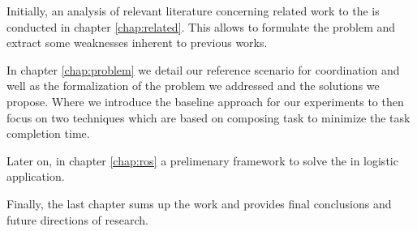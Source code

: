 Initially, an analysis of relevant literature concerning related work to the \mrs 
is conducted in chapter \ref{chap:related}. This allows to formulate the problem 
and extract some weaknesses inherent to previous works.

In chapter \ref{chap:problem} we detail our reference scenario for \mrs coordination and 
well as the formalization of the problem we addressed and the solutions we propose.
Where we introduce the baseline approach for our experiments to then focus on two techniques
which are based on composing task to minimize the task completion time.

Later on, in chapter \ref{chap:ros} a prelimenary framework to solve the \mrs in logistic 
application. 

Finally, the last chapter sums up the work and provides final conclusions and future
directions of research.





